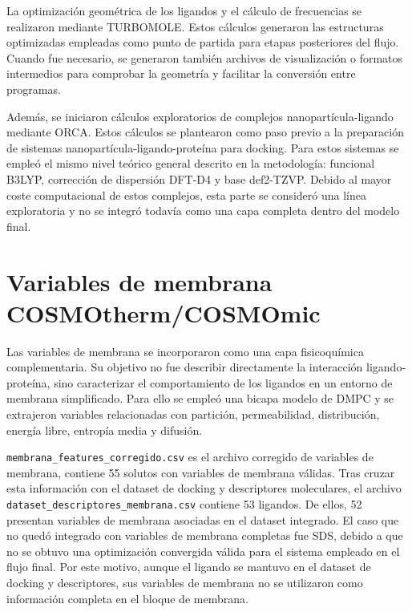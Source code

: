 \documentclass[
  spanish,
  a4paper,
  12pt,
  oneside,
  openany]{memoir}
\begin{document}
La optimización geométrica de los ligandos y el cálculo de frecuencias
se realizaron mediante TURBOMOLE. Estos cálculos generaron las
estructuras optimizadas empleadas como punto de partida para etapas
posteriores del flujo. Cuando fue necesario, se generaron también
archivos de visualización o formatos intermedios para comprobar la
geometría y facilitar la conversión entre programas.

Además, se iniciaron cálculos exploratorios de complejos
nanopartícula-ligando mediante ORCA. Estos cálculos se plantearon como
paso previo a la preparación de sistemas nanopartícula-ligando-proteína
para docking. Para estos sistemas se empleó el mismo nivel teórico
general descrito en la metodología: funcional B3LYP, corrección de
dispersión DFT-D4 y base def2-TZVP. Debido al mayor coste computacional
de estos complejos, esta parte se consideró una línea exploratoria y no
se integró todavía como una capa completa dentro del modelo final.

\section{Variables de membrana COSMOtherm/COSMOmic}

Las variables de membrana se incorporaron como una capa fisicoquímica
complementaria. Su objetivo no fue describir directamente la interacción
ligando-proteína, sino caracterizar el comportamiento de los ligandos en
un entorno de membrana simplificado. Para ello se empleó una bicapa
modelo de DMPC y se extrajeron variables relacionadas con partición,
permeabilidad, distribución, energía libre, entropía media y difusión.

\texttt{membrana\_features\_corregido.csv} es el archivo corregido de
variables de membrana, contiene 55 solutos con variables de membrana
válidas. Tras cruzar esta información con el dataset de docking y
descriptores moleculares, el archivo
\texttt{dataset\_descriptores\_membrana.csv} contiene 53 ligandos. De
ellos, 52 presentan variables de membrana asociadas en el dataset
integrado. El caso que no quedó integrado con variables de membrana
completas fue SDS, debido a que no se obtuvo una optimización convergida
válida para el sistema empleado en el flujo final. Por este motivo,
aunque el ligando se mantuvo en el dataset de docking y descriptores,
sus variables de membrana no se utilizaron como información completa en
el bloque de membrana.
\end{document}
